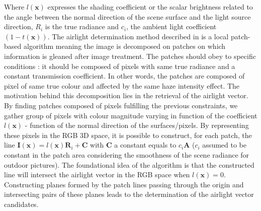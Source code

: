 \documentclass[conference]{IEEEtran}
\begin{document}
Where $l(\mathbf{x})$ expresses the shading coefficient or the scalar brightness related to the angle between the normal direction of the scene surface and
the light source direction, $R_i$ is the true radiance and $c_i$, the ambient light coefficient $(1-t(\mathbf{x}))$.
The airlight determination method described in \cite{airlight} is a local patch-based algorithm meaning the image is decomposed on patches on which information is
gleaned after image treatment.  The patches should obey to specific conditions : it should be composed of pixels with same
true radiance and a constant transmission coefficient. In other words, the patches are composed of pixel of same true colour and affected
by the same haze intensity effect. The motivation behind this decomposition lies in the retrieval of the airlight
vector.  By finding patches composed of pixels fulfilling the previous constraints, we gather group of pixels with colour magnitude
varying in function of the coefficient $l(\mathbf{x})$ - function of the normal direction of the surfaces/pixels.  By representing these pixels in the RGB 3D space, it is possible to construct, for each patch, the line $\mathbf{I}(\mathbf{x}) = l(\mathbf{x}) \mathbf{R}_i + \mathbf{C}$ 
with $\mathbf{C}$ a constant equals to $c_i \mathbf{A}$ ($c_i$ assumed to be constant in the patch area considering the smoothness of the scene radiance for outdoor pictures).
The foundational idea of the algorithm is that the constructed line will intersect the airlight vector in the RGB space when $l(\mathbf{x}) = 0$.
Constructing planes formed by the patch lines passing through the origin and intersecting pairs of these planes leads to the determination of the airlight vector candidates.
\end{document}
